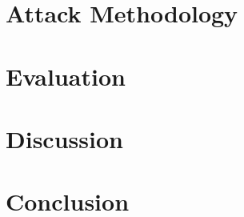 \documentclass[letterpaper,twocolumn,10pt]{article}
\begin{document}
\section{Attack Methodology}
\label{sec:method}

 
\section{Evaluation}
\label{sec:eval}

 
\section{Discussion}
\label{sec:discussion}

 
\section{Conclusion}
\label{sec:conclusion}

 

\nocite{kolosnjaji2018adversarial,zhan2024malpatch}



\end{document}
